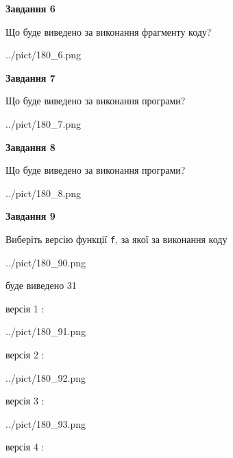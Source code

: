 \documentclass[12pt, ukrainian]{article}
\def\code#1{\Verb!#1!}
\begin{document}
{\begin {large}
{\begin {center}\textbf{Завдання 6}\end {center}}

Що буде виведено за виконання фрагменту коду?\par
\begin{center}
	{../pict/180_6.png}
\end{center}
\newpage

{\begin {center}\textbf{Завдання 7}\end {center}}

Що буде виведено за виконання програми?\par
\begin{center}
	{../pict/180_7.png}
\end{center}
\newpage

{\begin {center}\textbf{Завдання 8}\end {center}}

Що буде виведено за виконання програми?\par
\begin{center}
	{../pict/180_8.png}
\end{center}
\newpage

{\begin {center}\textbf{Завдання 9}\end {center}}

Виберіть версію функції \code{f}, за якої за виконання коду
\begin{center}
	{../pict/180_90.png}
\end{center}
буде виведено 31

\vspace{5mm}
версія 1 :

\begin{center}
	{../pict/180_91.png}
\end{center}
версія 2 :

\begin{center}
	{../pict/180_92.png}
\end{center}
версія 3 :

\begin{center}
	{../pict/180_93.png}
\end{center}
версія 4 :


\end{large}}
\end{document}
